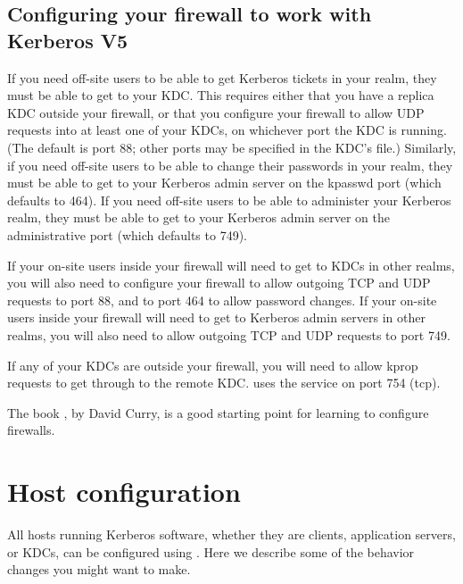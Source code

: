 \documentclass[letterpaper,10pt,english]{sphinxmanual}
\begin{document}
\section{Configuring your firewall to work with Kerberos V5}
\label{\detokenize{admin/appl_servers:conf-firewall}}\label{\detokenize{admin/appl_servers:configuring-your-firewall-to-work-with-kerberos-v5}}
If you need off-site users to be able to get Kerberos tickets in your
realm, they must be able to get to your KDC.  This requires either
that you have a replica KDC outside your firewall, or that you
configure your firewall to allow UDP requests into at least one of
your KDCs, on whichever port the KDC is running.  (The default is port
88; other ports may be specified in the KDC’s {\hyperref[\detokenize{admin/conf_files/kdc_conf:kdc-conf-5}]{}}
file.)  Similarly, if you need off-site users to be able to change
their passwords in your realm, they must be able to get to your
Kerberos admin server on the kpasswd port (which defaults to 464).  If
you need off-site users to be able to administer your Kerberos realm,
they must be able to get to your Kerberos admin server on the
administrative port (which defaults to 749).

If your on-site users inside your firewall will need to get to KDCs in
other realms, you will also need to configure your firewall to allow
outgoing TCP and UDP requests to port 88, and to port 464 to allow
password changes.  If your on-site users inside your firewall will
need to get to Kerberos admin servers in other realms, you will also
need to allow outgoing TCP and UDP requests to port 749.

If any of your KDCs are outside your firewall, you will need to allow
kprop requests to get through to the remote KDC.  {\hyperref[\detokenize{admin/admin_commands/kprop:kprop-8}]{}} uses
the  service on port 754 (tcp).

The book , by David Curry, is a good starting
point for learning to configure firewalls.


\chapter{Host configuration}
\label{\detokenize{admin/host_config:host-configuration}}\label{\detokenize{admin/host_config::doc}}
All hosts running Kerberos software, whether they are clients,
application servers, or KDCs, can be configured using
{\hyperref[\detokenize{admin/conf_files/krb5_conf:krb5-conf-5}]{}}.  Here we describe some of the behavior changes
you might want to make.
\end{document}
